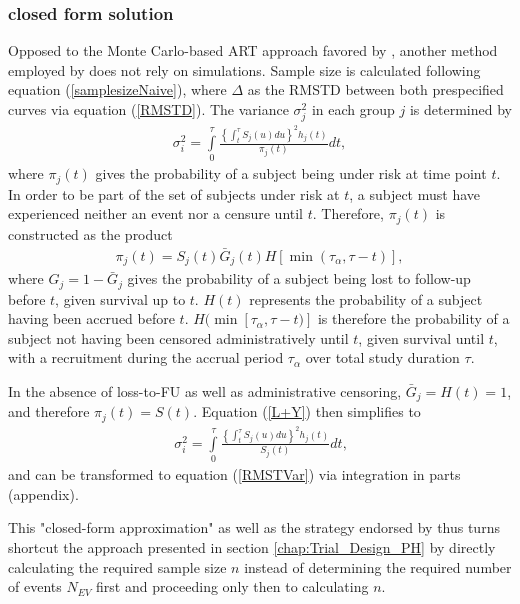 \documentclass[main.tex]{subfiles}
\begin{document}
\subsubsection{closed form solution}
Opposed to the Monte Carlo-based ART approach favored by \textcite{Royston2013-ad}, another method employed by \textcite{Yung2020-ht} does not rely on simulations. Sample size is calculated following equation (\ref{samplesizeNaive}), where $\Delta$ as the RMSTD between both prespecified curves via equation (\ref{RMSTD}). The variance $\sigma_j^2$ in each group $j$ is determined  by
\begin{align}\label{L+Y}
\sigma_i^2=\int\limits_0^\tau \frac{\left\{ \int _t^\tau S_j(u)du \right\}^2 h_j(t)}{\pi_j(t)}dt,
\end{align}
where $\pi_j(t)$ gives the probability of a subject being under risk at time point $t$. In order to be part of the set of subjects under risk at $t$, a subject must have experienced neither an event nor a censure until $t$. Therefore, $\pi_j(t)$ is constructed as the product
\begin{align}
\pi_j(t) = S_j(t)\bar{G}_j(t)H[\min(\tau_\alpha, \tau - t)],
\end{align}
where $G_j=1-\bar{G}_j$ gives the probability of a subject being lost to follow-up before $t$, given survival up to $t$. $H(t)$ represents the probability of a subject having been accrued before $t$. $H(\min[\tau_\alpha, \tau - t)]$ is therefore the probability of a subject not having been censored administratively until $t$, given survival until $t$, with a recruitment during the accrual period $\tau_\alpha$ over total study duration $\tau$.

In the absence of loss-to-FU as well as administrative censoring, $\bar{G}_j = H(t) = 1$, and therefore $\pi_j(t) = S(t)$. Equation (\ref{L+Y}) then simplifies to
\begin{align}\label{L+Y}\
\sigma_i^2=\int\limits_0^\tau \frac{\left\{ \int _t^\tau S_j(u)du \right\}^2 h_j(t)}{S_j(t)}dt,
\end{align}
and can be transformed to equation (\ref{RMSTVar}) via integration in parts (appendix).

This "closed-form approximation" \textcite[p. 942]{Yung2020-ht} as well as the strategy endorsed by \textcite{Royston2013-ad} thus turns shortcut the approach presented in section \ref{chap:Trial_Design_PH} by directly calculating the required sample size $n$ instead of determining the required number of events $N_{EV}$ first and proceeding only then to calculating $n$.
\end{document}
